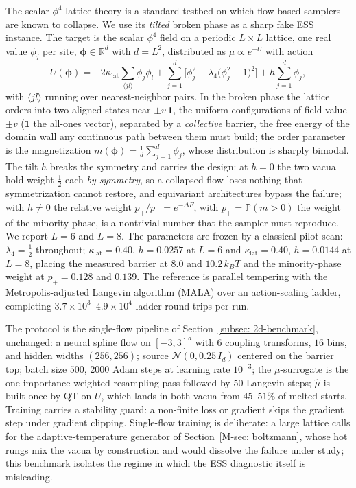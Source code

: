 \documentclass{article}
\begin{document}
The scalar $\phi^4$ lattice theory is a standard testbed on which flow-based samplers are known to collapse. We use its \emph{tilted} broken phase as a sharp fake ESS instance. The target is the scalar $\phi^4$ field on a periodic $L \times L$ lattice, one real value $\phi_j$ per site, $\boldsymbol{\phi} \in \mathbb R^{d}$ with $d = L^2$, distributed as $\mu \propto e^{-U}$ with action
\begin{equation*}
    U(\boldsymbol{\phi}) = -2\kappa_{\mathrm{lat}} \sum_{\langle j l \rangle} \phi_j \phi_l + \sum_{j=1}^{d} \Big[ \phi_j^2 + \lambda_4\big(\phi_j^2 - 1\big)^2 \Big] + h \sum_{j=1}^{d} \phi_j ,
\end{equation*}
with $\langle j l \rangle$ running over nearest-neighbor pairs. In the broken phase the lattice orders into two aligned states near $\pm v\,\mathbf 1$, the uniform configurations of field value $\pm v$ ($\mathbf 1$ the all-ones vector), separated by a \emph{collective} barrier, the free energy of the domain wall any continuous path between them must build; the order parameter is the magnetization $m(\boldsymbol{\phi}) = \frac{1}{d}\sum_{j=1}^{d} \phi_j$, whose distribution is sharply bimodal. The tilt $h$ breaks the symmetry and carries the design: at $h = 0$ the two vacua hold weight $\frac12$ each \emph{by symmetry}, so a collapsed flow loses nothing that symmetrization cannot restore, and equivariant architectures bypass the failure; with $h \ne 0$ the relative weight $p_+/p_- = e^{-\Delta F}$, with $p_+ = \mathbb P(m > 0)$ the weight of the minority phase, is a nontrivial number that the sampler must reproduce. We report $L = 6$ and $L = 8$. The parameters are frozen by a classical pilot scan: $\lambda_4 = \frac12$ throughout; $\kappa_{\mathrm{lat}} = 0.40$, $h = 0.0257$ at $L = 6$ and $\kappa_{\mathrm{lat}} = 0.40$, $h = 0.0144$ at $L = 8$, placing the measured barrier at $8.0$ and $10.2\,k_B T$ and the minority-phase weight at $p_+ = 0.128$ and $0.139$. The reference is parallel tempering with the Metropolis-adjusted Langevin algorithm (MALA) over an action-scaling ladder, completing $3.7\times 10^3$--$4.9\times 10^4$ ladder round trips per run.

The protocol is the single-flow pipeline of Section~\ref{subsec: 2d-benchmark}, unchanged: a neural spline flow on $[-3,3]^d$ with $6$ coupling transforms, $16$ bins, and hidden widths $(256, 256)$; source $\mathcal N(0, 0.25\, I_d)$ centered on the barrier top; batch size $500$, $2000$ Adam steps at learning rate $10^{-3}$; the $\mu$-surrogate is the one importance-weighted resampling pass followed by $50$ Langevin steps; $\hat\mu$ is built once by QT on $U$, which lands in both vacua from $45$--$51\%$ of melted starts. Training carries a stability guard: a non-finite loss or gradient skips the gradient step under gradient clipping. Single-flow training is deliberate: a large lattice calls for the adaptive-temperature generator of Section~\ref{M-sec: boltzmann}, whose hot rungs mix the vacua by construction and would dissolve the failure under study; this benchmark isolates the regime in which the ESS diagnostic itself is misleading.
\end{document}
